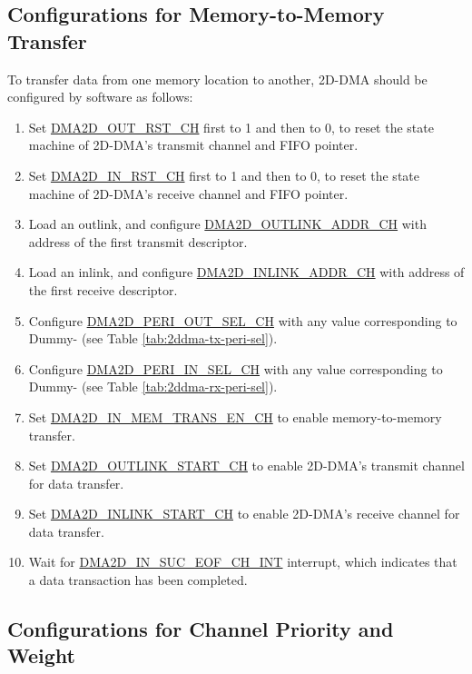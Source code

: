 \documentclass[main\_\_EN.tex]{subfiles}
\begin{document}
\subsection{Configurations for Memory-to-Memory Transfer}
To transfer data from one memory location to another, 2D-DMA should be configured by software as follows:
\begin{enumerate}
    \item Set \hyperref[fielddesc:DMA2DOUTRSTCHN]{DMA2D\_OUT\_RST\_CH} first to 1 and then to 0, to reset the state machine of 2D-DMA's transmit channel and FIFO pointer.
    \item Set \hyperref[fielddesc:DMA2DINRSTCHN]{DMA2D\_IN\_RST\_CH} first to 1 and then to 0, to reset the state machine of 2D-DMA's receive channel and FIFO pointer.
    \item Load an outlink, and configure \hyperref[fielddesc:DMA2DOUTLINKADDRCHN]{DMA2D\_OUTLINK\_ADDR\_CH} with address of the first transmit descriptor.
    \item Load an inlink, and configure \hyperref[fielddesc:DMA2DINLINKADDRCHN]{DMA2D\_INLINK\_ADDR\_CH} with address of the first receive descriptor.
    \item Configure \hyperref[fielddesc:DMA2DOUTPERISELCHN]{DMA2D\_PERI\_OUT\_SEL\_CH} with any value corresponding to Dummy- (see Table \ref{tab:2ddma-tx-peri-sel}).
    \item Configure \hyperref[fielddesc:DMA2DINPERISELCHN]{DMA2D\_PERI\_IN\_SEL\_CH} with any value corresponding to Dummy- (see Table \ref{tab:2ddma-rx-peri-sel}).
    \item Set \hyperref[fielddesc:DMA2DINMEMTRANSENCHN]{DMA2D\_IN\_MEM\_TRANS\_EN\_CH} to enable memory-to-memory transfer.
    \item Set \hyperref[fielddesc:DMA2DOUTLINKSTARTCHN]{DMA2D\_OUTLINK\_START\_CH} to enable 2D-DMA's transmit channel for data transfer.
    \item Set \hyperref[fielddesc:DMA2DINLINKSTARTCHN]{DMA2D\_INLINK\_START\_CH} to enable 2D-DMA's receive channel for data transfer.
    \item Wait for \hyperref[int:DMA2DINSUCEOFINT]{DMA2D\_IN\_SUC\_EOF\_CH\_INT} interrupt, which indicates that a data transaction has been completed.
\end{enumerate}

\subsection{Configurations for Channel Priority and Weight}
\end{document}
